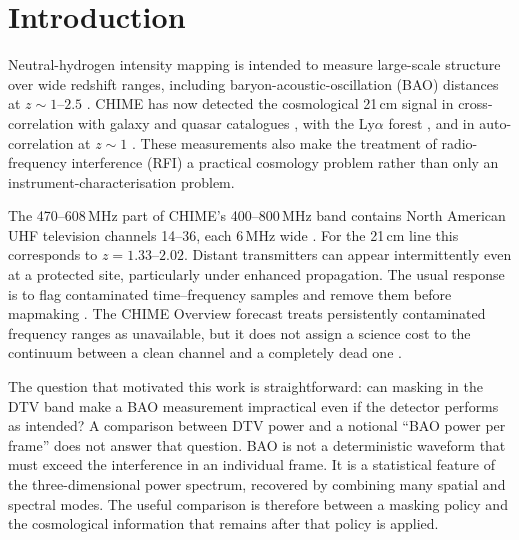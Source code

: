 
\section{Introduction}
\label{sec:intro}

Neutral-hydrogen intensity mapping is intended to measure large-scale
structure over wide redshift ranges, including baryon-acoustic-oscillation
(BAO) distances at $z\sim1$--$2.5$ \citep{SeoEisenstein2007,Bull2015}.
CHIME has now detected the cosmological 21\,cm signal in cross-correlation
with galaxy and quasar catalogues \citep{CHIMEDetection2023}, with the
Ly$\alpha$ forest \citep{CHIMELya2024}, and in auto-correlation at
$z\sim1$ \citep{CHIMEAuto2025}. These measurements also make the
treatment of radio-frequency interference (RFI) a practical cosmology
problem rather than only an instrument-characterisation problem.

The 470--608\,MHz part of CHIME's 400--800\,MHz band contains North
American UHF television channels 14--36, each 6\,MHz wide \citep{ATSC53}.
For the 21\,cm line this corresponds to $z=1.33$--$2.02$. Distant
transmitters can appear intermittently even at a protected site,
particularly under enhanced propagation. The usual response is to flag
contaminated time--frequency samples and remove them before mapmaking
\citep[e.g.][]{Offringa2012,CHIMEOverview2022}. The CHIME Overview
forecast treats persistently contaminated frequency ranges as
unavailable, but it does not assign a science cost to the continuum
between a clean channel and a completely dead one
\citep[Fig.~31 and Appendix~A]{CHIMEOverview2022}.

The question that motivated this work is straightforward: can masking in
the DTV band make a BAO measurement impractical even if the detector
performs as intended? A comparison between DTV power and a notional
``BAO power per frame'' does not answer that question. BAO is not a
deterministic waveform that must exceed the interference in an
individual frame. It is a statistical feature of the three-dimensional
power spectrum, recovered by combining many spatial and spectral modes.
The useful comparison is therefore between a masking policy and the
cosmological information that remains after that policy is applied.

